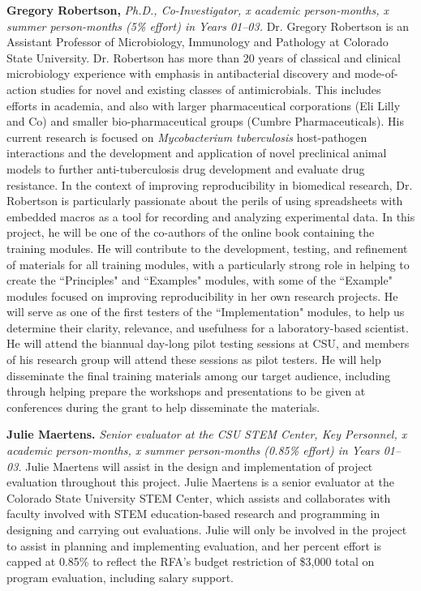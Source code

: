 \documentclass[pdftex,english,11pt,parskip=half]{scrartcl}
\begin{document}
\noindent \textbf{Gregory Robertson,} \textit{Ph.D., Co-Investigator, x academic person-months, x summer person-months (5\% effort) in Years 01--03.} Dr. Gregory Robertson is an Assistant Professor of Microbiology, Immunology and Pathology at Colorado State University. Dr. Robertson has more than 20 years of classical and clinical microbiology experience with emphasis in antibacterial discovery and mode-of-action studies for novel and existing classes of antimicrobials. This includes efforts in academia, and also with larger pharmaceutical corporations (Eli Lilly and Co) and smaller bio-pharmaceutical groups (Cumbre Pharmaceuticals). His current research is focused on \textit{Mycobacterium tuberculosis} host-pathogen interactions and the development and application of novel preclinical animal models to further anti-tuberculosis drug development and evaluate drug resistance. In the context of improving reproducibility in biomedical research, Dr. Robertson is particularly passionate about the perils of using spreadsheets with embedded macros as a tool for recording and analyzing experimental data. In this project, he will be one of the co-authors of the online book containing the training modules. He will contribute to the development, testing, and refinement of materials for all training modules, with a particularly strong role in helping to create the ``Principles" and ``Examples" modules, with some of the ``Example" modules focused on improving reproducibility in her own research projects. He will serve as one of the first testers of the ``Implementation" modules, to help us determine their clarity, relevance, and usefulness for a laboratory-based scientist. He will attend the biannual day-long pilot testing sessions at CSU, and members of his research group will attend these sessions as pilot testers. He will help disseminate the final training materials among our target audience, including through helping prepare the workshops and presentations to be given at conferences during the grant to help disseminate the materials. 

\noindent \textbf{Julie Maertens.} \textit{Senior evaluator at the CSU STEM Center, Key Personnel, x academic person-months, x summer person-months (0.85\% effort) in Years 01--03.} Julie Maertens will assist in the design and implementation of project evaluation throughout this project. Julie Maertens is a senior evaluator at the Colorado State University STEM Center, which assists and collaborates with faculty involved with STEM education-based research and programming in designing and carrying out evaluations. Julie will only be involved in the project to assist in planning and implementing evaluation, and her percent effort is capped at 0.85\% to reflect the RFA's budget restriction of \$3,000 total on program evaluation, including salary support.
\end{document}
